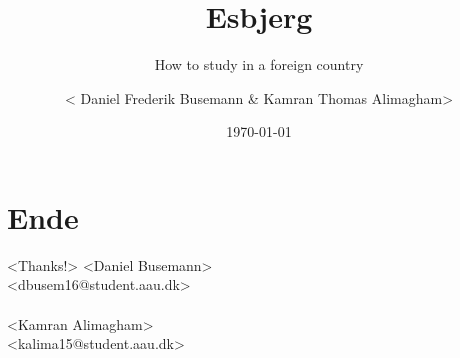 \documentclass[fleqn,11pt,aspectratio=169]{beamer}
\title[Esbjerg]{Esbjerg}
\subtitle{How to study in a foreign country}
\author[bw\_ \& kamranthomas]{\textless{} Daniel Frederik Busemann \& Kamran Thomas Alimagham\textgreater}
\date{\today}
\begin{document}
\begin{frame}[plain]
  \titlepage
\end{frame}






\section{Ende}
\begin{finalframe}{\textless{}Thanks!\textgreater}
\textless{}Daniel Busemann\textgreater\\
\textless{}dbusem16@student.aau.dk\textgreater\\\\
\textless{}Kamran Alimagham\textgreater\\
\textless{}kalima15@student.aau.dk\textgreater\\
\end{finalframe}
\end{document}
